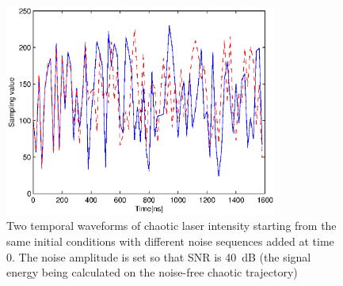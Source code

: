 %
\begin{figure}
  \centering
  \includegraphics[width=0.8\textwidth]{chaos_noise.eps}
  \hspace{0.5cm}
  \caption{Two temporal waveforms of chaotic laser intensity starting
    from the same initial conditions with different noise sequences
    added at time $0$. The noise amplitude is set so that SNR is 40~dB
    (the signal energy being calculated on the noise-free chaotic
    trajectory)}
  \label{noise_chaotic_signal}
\end{figure}
%
